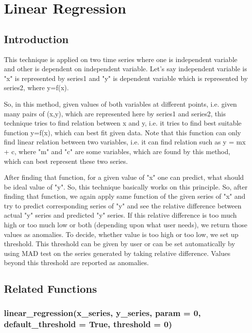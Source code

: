 \chapter{Linear Regression}

\section{Introduction}

This technique is applied on two time series where one is independent variable and other is dependent on independent variable. Let's say independent variable is "x" is represented by series1 and "y" is dependent variable which is represented by series2, where y=f(x). 

So, in this method, given values of both variables at different points, i.e. given many pairs of (x,y), which are represented here by series1 and series2, this technique tries to find relation between x and y, i.e. it tries to find best suitable function y=f(x), which can best fit given data. Note that this function can only find linear relation between two variables, i.e. it can find relation such as y = mx + c, where "m" and "c" are some variables, which are found by this method, which can best represent these two series. 

After finding that function, for a given value of "x" one can predict, what should be ideal value of "y". So, this technique basically works on this principle. So, after finding that function, we again apply same function of the given series of "x" and try to predict corresponding series of "y" and see the relative difference between actual "y" series and predicted "y" series. If this relative difference is too much high or too much low or both (depending upon what user needs), we return those values as anomalies. To decide, whether value is too high or too low, we set up threshold. This threshold can be given by user or can be set automatically by using MAD test on the series generated by taking relative difference. Values beyond this threshold are reported as anomalies.

\section{Related Functions}

\subsection{linear\_regression(x\_series, y\_series, param = 0, default\_threshold = True, threshold = 0)}

